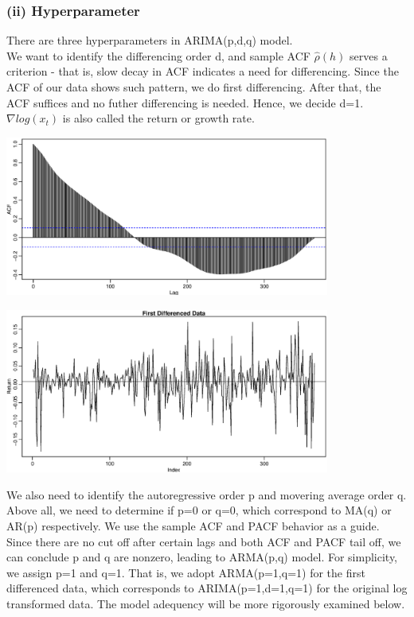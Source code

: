 \documentclass[11pt,a4paper]{article}
\begin{document}
\subsubsection*{(ii) Hyperparameter}
There are three hyperparameters in ARIMA(p,d,q) model. \\
We want to identify the differencing order d, and sample ACF $\hat\rho(h)$ serves a criterion - that is, slow decay in ACF indicates a need for differencing. Since the ACF of our data shows such pattern, we do first differencing. After that, the ACF suffices and no futher differencing is needed. Hence, we decide d=1. $\nabla log(x_t)$ is also called the return or growth rate. \\


\begin{center}
   \includegraphics[width=0.8\textwidth]{acf1.eps}
\end{center}
\graphicspath{{./Figures/}}

\begin{center}
   \includegraphics[width=0.8\textwidth]{return.eps}
\end{center}
\graphicspath{{./Figures/}}

We also need to identify the autoregressive order p and movering average order q. Above all, we need to determine if p=0 or q=0, which correspond to MA(q) or AR(p) respectively. We use the sample ACF and PACF behavior as a guide. Since there are no cut off after certain lags and both ACF and PACF tail off, we can conclude p and q are nonzero, leading to ARMA(p,q) model. For simplicity, we assign p=1 and q=1. That is, we adopt ARMA(p=1,q=1) for the first differenced data, which corresponds to ARIMA(p=1,d=1,q=1) for the original log transformed data. The model adequency will be more rigorously examined below.
\end{document}

